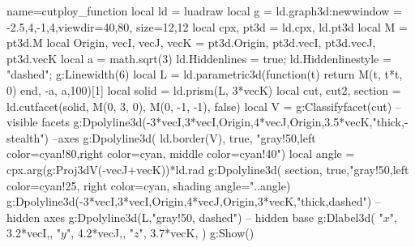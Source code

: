 \documentclass{standalone}
\begin{document}
    \begin{luadraw}{name=cutploy_function}
    local ld = luadraw
    local g = ld.graph3d:new{window = {-2.5,4,-1,4},viewdir={40,80}, size={12,12}}
    local cpx, pt3d = ld.cpx, ld.pt3d
    local M = pt3d.M
    local Origin, vecI, vecJ, vecK = pt3d.Origin, pt3d.vecI, pt3d.vecJ, pt3d.vecK
    local a = math.sqrt(3)
    ld.Hiddenlines = true; ld.Hiddenlinestyle = "dashed"; g:Linewidth(6)
    local L = ld.parametric3d(function(t) return M(t, t*t, 0) end, -a, a,100)[1]
    local solid = ld.prism(L, 3*vecK)
    local cut, cut2, section = ld.cutfacet(solid, {M(0, 3, 0), M(0, -1, -1)}, false)    
    local V = g:Classifyfacet(cut) -- visible facets
    g:Dpolyline3d({{-3*vecI,3*vecI},{Origin,4*vecJ},{Origin,3.5*vecK}},"thick,-stealth") --axes
    g:Dpolyline3d( ld.border(V), true, "gray!50,left  color=cyan!80,right color=cyan, middle color=cyan!40")
    local angle = cpx.arg(g:Proj3dV(-vecJ+vecK))*ld.rad
    g:Dpolyline3d( section, true,"gray!50,left color=cyan!25, right color=cyan, shading angle="..angle)
    g:Dpolyline3d({{-3*vecI,3*vecI},{Origin,4*vecJ},{Origin,3*vecK}},"thick,dashed") -- hidden axes
    g:Dpolyline3d(L,"gray!50, dashed") -- hidden base
    g:Dlabel3d(
        "$x$", 3.2*vecI,{},
        "$y$", 4.2*vecJ,{},
        "$z$", 3.7*vecK,{}
     )
    g:Show()
    \end{luadraw}
\end{document}
